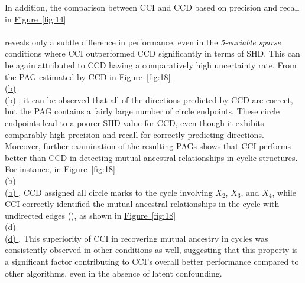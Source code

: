\documentclass[twoside, 11pt]{article}
\newcommand*{\figref}[2][]{%
  \hyperref[{fig:#2}]{%
    Figure~\ref*{fig:#2}%
    \ifx\\#1\\%
    \else
      #1%
    \fi
  }%
}
\begin{document}


In addition, the comparison between CCI and CCD based on precision and recall in \figref[]{14} reveals only a subtle difference in performance, even in the \textit{5-variable sparse} conditions where CCI outperformed CCD significantly in terms of SHD. This can be again attributed to CCD having a comparatively high uncertainty rate. From the PAG estimated by CCD in \figref[(b)]{18}, it can be observed that all of the directions predicted by CCD are correct, but the PAG contains a fairly large number of circle endpoints. These circle endpoints lead to a poorer SHD value for CCD, even though it exhibits comparably high precision and recall for correctly predicting directions.
Moreover, further examination of the resulting PAGs shows that CCI performs better than CCD in detecting mutual ancestral relationships in cyclic structures. For instance, in \figref[(b)]{18}, CCD assigned all circle marks to the cycle involving $X_2$, $X_3$, and $X_4$, while CCI correctly identified the mutual ancestral relationships in the cycle with undirected edges (\textemdash), as shown in \figref[(d)]{18}. This superiority of CCI in recovering mutual ancestry in cycles was consistently observed in other conditions as well, suggesting that this property is a significant factor contributing to CCI's overall better performance compared to other algorithms, even in the absence of latent confounding.
\end{document}
